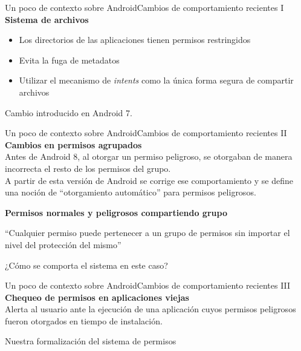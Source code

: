 \documentclass[pdf]{beamer} %
\begin{document}
\begin{frame}{Un poco de contexto sobre Android}{Cambios de comportamiento recientes I}
    \textbf{Sistema de archivos}\\
    \vspace{10px}
    \begin{itemize}
        \item Los directorios de las aplicaciones tienen permisos restringidos
        \item Evita la fuga de metadatos
        \item Utilizar el mecanismo de \textit{intents} como la única forma segura de compartir
              archivos
    \end{itemize}
    \vspace{10px}
    \pause
    Cambio introducido en Android 7.
\end{frame}

\begin{frame}{Un poco de contexto sobre Android}{Cambios de comportamiento recientes II}
    \textbf{Cambios en permisos agrupados} \\
    \vspace{10px}
    Antes de Android 8, al otorgar un permiso peligroso, se otorgaban de manera incorrecta el resto
    de los permisos del grupo.\\
    \vspace{5px}
    A partir de esta versión de Android se corrige ese comportamiento y se define una noción de
    ``otorgamiento automático'' para permisos peligrosos.

    \vspace{10px} \pause
    \textbf{Permisos normales y peligrosos compartiendo grupo} \\
    \begin{block}{}
        ``Cualquier permiso puede pertenecer a un grupo de permisos sin importar el nivel del
        protección del mismo''
    \end{block}
    \pause
    ¿Cómo se comporta el sistema en este caso?
\end{frame}

\begin{frame}{Un poco de contexto sobre Android}{Cambios de comportamiento recientes III}
    \textbf{Chequeo de permisos en aplicaciones viejas} \\
    \vspace{10px}
    Alerta al usuario ante la ejecución de una aplicación cuyos permisos peligrosos fueron otorgados
    en tiempo de instalación.
\end{frame}

\begin{frame}{Nuestra formalización del sistema de permisos}

\end{frame}
\end{document}
